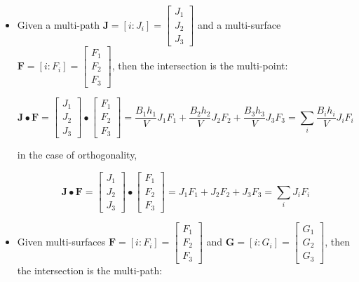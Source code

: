 \begin{itemize}
\item Given a multi-path \(\mathbf{J} = [i : J_i] = \begin{bmatrix} J_1 \\ J_2 \\ J_3 \end{bmatrix}\) and a multi-surface \(\mathbf{F} = [i : F_i] = \begin{bmatrix} F_1 \\ F_2 \\ F_3 \end{bmatrix}\), then the intersection is the multi-point:

\[\mathbf{J} \bullet \mathbf{F} = \begin{bmatrix} J_1 \\ J_2 \\ J_3 \end{bmatrix} \bullet \begin{bmatrix} F_1 \\ F_2 \\ F_3 \end{bmatrix} = \frac{B_1 h_1}{V} J_1 F_1 + \frac{B_2 h_2}{V} J_2 F_2 + \frac{B_3 h_3}{V} J_3 F_3 = \sum_i \frac{B_i h_i}{V} J_i F_i\]

in the case of orthogonality,

\[\mathbf{J} \bullet \mathbf{F} = \begin{bmatrix} J_1 \\ J_2 \\ J_3 \end{bmatrix} \bullet \begin{bmatrix} F_1 \\ F_2 \\ F_3 \end{bmatrix} = J_1 F_1 + J_2 F_2 + J_3 F_3 = \sum_i J_i F_i\]


\item Given multi-surfaces \(\mathbf{F} = [i : F_i] = \begin{bmatrix} F_1 \\ F_2 \\ F_3 \end{bmatrix}\) and \(\mathbf{G} = [i : G_i] = \begin{bmatrix} G_1 \\ G_2 \\ G_3 \end{bmatrix}\), then the intersection is the multi-path:


\end{itemize}
